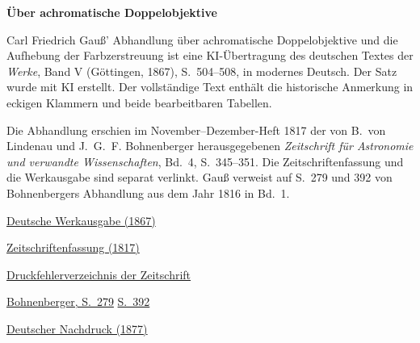 \clearpage
\thispagestyle{empty}
\begin{center}\Large\textbf{Über achromatische Doppelobjektive}\end{center}

Carl Friedrich Gauß’ Abhandlung über achromatische Doppelobjektive und die Aufhebung der Farbzerstreuung ist eine KI-Übertragung des deutschen Textes der \textit{Werke}, Band V (Göttingen, 1867), S.~504--508, in modernes Deutsch. Der Satz wurde mit KI erstellt. Der vollständige Text enthält die historische Anmerkung in eckigen Klammern und beide bearbeitbaren Tabellen.

Die Abhandlung erschien im November--Dezember-Heft 1817 der von B.~von Lindenau und J.~G.~F. Bohnenberger herausgegebenen \textit{Zeitschrift für Astronomie und verwandte Wissenschaften}, Bd.~4, S.~345--351. Die Zeitschriftenfassung und die Werkausgabe sind separat verlinkt. Gauß verweist auf S.~279 und 392 von Bohnenbergers Abhandlung aus dem Jahr 1816 in Bd.~1.

\medskip\noindent
\href{https://gdz.sub.uni-goettingen.de/id/PPN236006339}{Deutsche Werkausgabe (1867)}\par
\noindent\href{https://www.digitale-sammlungen.de/view/bsb10061006?page=345}{Zeitschriftenfassung (1817)}\par
\noindent\href{https://www.digitale-sammlungen.de/view/bsb10061006?page=390}{Druckfehlerverzeichnis der Zeitschrift}\par
\noindent\href{https://www.digitale-sammlungen.de/view/bsb10061003?page=287}{Bohnenberger, S.~279}\quad
\href{https://www.digitale-sammlungen.de/view/bsb10061003?page=400}{S.~392}\par
\noindent\href{https://doi.org/10.1007/978-3-642-49319-5_24}{Deutscher Nachdruck (1877)}
\clearpage
